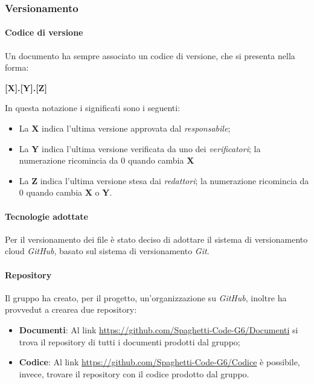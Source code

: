 \subsubsection{Versionamento}
\label{ssub:versionamento}

\paragraph{Codice di versione}
\label{par:codice_versione}

Un documento ha sempre associato un codice di versione, che si presenta nella forma:
\begin{center}
    \textbf{[X].[Y].[Z]}
\end{center}
In questa notazione i significati sono i seguenti:
\begin{itemize}
    \item La \textbf{X} indica l'ultima versione approvata dal \emph{responsabile};
    \item La \textbf{Y} indica l'ultima versione verificata da uno dei \emph{verificatori}; la numerazione ricomincia 
    da 0 quando cambia \textbf{X}
    \item La \textbf{Z} indica l'ultima versione stesa dai \emph{redattori}; la numerazione ricomincia da 0 quando 
    cambia \textbf{X} o \textbf{Y}.
\end{itemize}

\paragraph{Tecnologie adottate}
\label{par:tecnologie}

Per il versionamento dei file è stato deciso di adottare il sistema di versionamento cloud \emph{GitHub}, basato sul 
sistema di versionamento \emph{Git}.

\paragraph{Repository}
\label{par:repo}

Il gruppo ha creato, per il progetto, un'organizzazione su \emph{GitHub}, inoltre ha provvedut a crearea due repository:
\begin{itemize}
    \item \textbf{Documenti}: Al link \url{https://github.com/Spaghetti-Code-G6/Documenti} si trova il repository di 
    tutti i documenti prodotti dal gruppo;
    \item \textbf{Codice}: Al link \url{https://github.com/Spaghetti-Code-G6/Codice} è possibile, invece, trovare il 
    repository con il codice prodotto dal gruppo.
\end{itemize}

